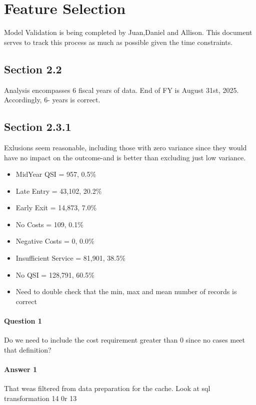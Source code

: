 \documentclass[12pt, letterpaper]{article}
\begin{document}
\pagestyle{cb} %

\newpage

\tableofcontents

\newpage

\section{Feature Selection} 
Model Validation is being completed by Juan,Daniel and Allison. This document serves to track this process as much as possible given the time constraints.
\subsection{Section 2.2} 
Analysis encompasses 6 fiscal years of data. End of FY is August 31st, 2025. Accordingly, 6- years is correct. 
\subsection{Section 2.3.1} 
Exlusions seem reasonable, including those with zero variance since they would have no impact on the outcome-and is better than excluding just low variance. 
\begin{itemize}
    \item MidYear QSI = 957, 0.5\%
    \item Late Entry = 43,102, 20.2\%
    \item Early Exit = 14,873, 7.0\%
    \item No Costs = 109, 0.1\%
    \item Negative Costs = 0, 0.0\%
    \item Insufficient Service = 81,901, 38.5\%
    \item No QSI = 128,791, 60.5\%
    \item Need to double check that the min, max and mean number of records is correct
\end{itemize}

\paragraph{Question 1} Do we need to include the cost requirement greater than 0 since no cases meet that definition?
\paragraph{Answer 1} That weas filtered from data preparation for the cache. Look at sql transformation 14 0r 13
\end{document}
